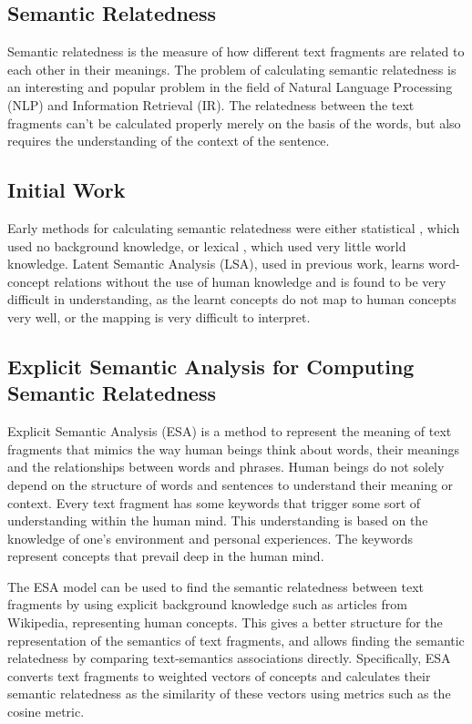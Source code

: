 \documentclass[conference]{IEEEtran}
\begin{document}
\subsection {Semantic Relatedness}

Semantic relatedness is the measure of how different text fragments are related to each other in their meanings. The problem of calculating semantic relatedness is an interesting and popular problem in the field of Natural Language Processing (NLP) and Information Retrieval (IR). The relatedness between the text fragments can't be calculated properly merely on the basis of the words, but also requires the understanding of the context of the sentence.

\subsection {Initial Work}

Early methods for calculating semantic relatedness were either statistical \cite{statistical, LSA}, which used no background knowledge, or lexical \cite{lexical}, which used very little world knowledge. Latent Semantic Analysis (LSA), used in previous work, \cite{LSA} learns word-concept relations without the use of human knowledge and is found to be very difficult in understanding, as the learnt concepts do not map to human concepts very well, or the mapping is very difficult to interpret.

\subsection {Explicit Semantic Analysis for Computing Semantic Relatedness}

Explicit Semantic Analysis (ESA) \cite{ESA} is a method to represent the meaning of text fragments that mimics the way human beings think about words, their meanings and the relationships between words and phrases. Human beings do not solely depend on the structure of words and sentences to understand their meaning or context. Every text fragment has some keywords that trigger some sort of understanding within the human mind. This understanding is based on the knowledge of one's environment and personal experiences. The keywords represent concepts that prevail deep in the human mind.

The ESA model can be used to find the semantic relatedness between text fragments by using explicit background knowledge such as articles from Wikipedia, representing human concepts. This gives a better structure for the representation of the semantics of text fragments, and allows finding the semantic relatedness by comparing text-semantics associations directly. Specifically, ESA converts text fragments to weighted vectors of concepts and calculates their semantic relatedness as the similarity of these vectors using metrics such as the cosine metric.
\end{document}
